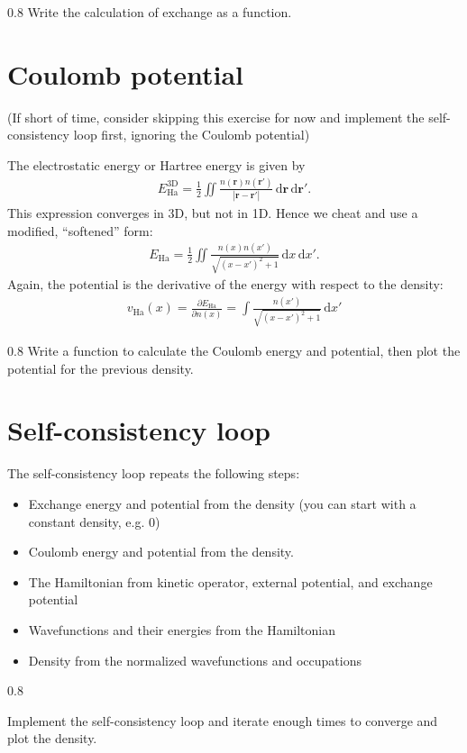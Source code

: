 \documentclass{article}
\newcommand{\exercise}[1]{
  \bigskip
  \begin{boxedminipage}[c]{0.8\linewidth}
  #1
  \end{boxedminipage}
  \bigskip
}
\newcommand{\dee}[0]{\mathrm d}
\newcommand{\idee}[0]{\,\dee}
\newcommand{\pdiff}[2]{\frac{\partial #1}{\partial #2}}
\begin{document}
\exercise{Write the calculation of exchange as a function.}

\section{Coulomb potential}
(If short of time, consider skipping this exercise for now and implement the
self-consistency loop first, ignoring the Coulomb potential)

The electrostatic energy or Hartree energy is given by
\begin{align}
  E_{\mathrm{Ha}}^{\mathrm{3D}} = \frac12 \iint \frac{n(\mathbf r)n(\mathbf r')}{|\mathbf r - \mathbf r'|}\idee \mathbf r \idee \mathbf r'.
\end{align}
This expression converges in 3D, but not in 1D.  Hence we cheat and use
a modified, ``softened'' form:
\begin{align}
E_{\mathrm{Ha}} = \frac12 \iint \frac{n(x) n(x')}{\sqrt{(x - x')^2 + 1}}
\idee x \idee x'.
\end{align}
Again, the potential is the derivative of the energy with respect to the
density:
\begin{align}
  v_{\mathrm{Ha}}(x) = \pdiff{E_{\mathrm{Ha}}}{n(x)} =
  \int \frac{n(x')}{\sqrt{(x - x')^2 + 1}} \idee x'
\end{align}

\exercise{Write a function to calculate the Coulomb energy and potential,
  then plot the potential for the previous density.}

\section{Self-consistency loop}
The self-consistency loop repeats the following steps:
\begin{itemize}
\item Exchange energy and potential from the density (you can start with a
  constant density, e.g. 0)
\item Coulomb energy and potential from the density.
\item The Hamiltonian from kinetic operator, external potential,
  and exchange potential
\item Wavefunctions and their energies from the Hamiltonian
\item Density from the normalized wavefunctions and occupations
\end{itemize}


\exercise{
  Implement the self-consistency loop and iterate enough times to converge
  and plot the density.
}
\end{document}
